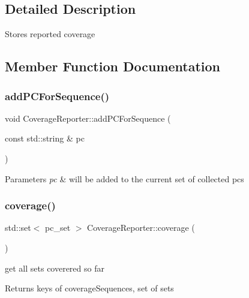 \subsection{Detailed Description}
Stores reported coverage 

\subsection{Member Function Documentation}
\mbox{\label{classCoverageReporter_a2ec8a765cc78851be632d08383e5dcac}} 
\subsubsection{\texorpdfstring{add\+P\+C\+For\+Sequence()}{addPCForSequence()}}
{\footnotesize\ttfamily void Coverage\+Reporter\+::add\+P\+C\+For\+Sequence (\begin{DoxyParamCaption}\item[{const std\+::string \&}]{pc }\end{DoxyParamCaption})}


\begin{DoxyParams}{Parameters}
{\em pc} & will be added to the current set of collected pcs \\
\hline
\end{DoxyParams}
\mbox{\label{classCoverageReporter_af515596c46758142ea7aa7dbbab47b7e}} 
\subsubsection{\texorpdfstring{coverage()}{coverage()}}
{\footnotesize\ttfamily std\+::set$<$ pc\+\_\+set $>$ Coverage\+Reporter\+::coverage (\begin{DoxyParamCaption}{ }\end{DoxyParamCaption})}

get all sets coverered so far \begin{DoxyReturn}{Returns}
keys of coverage\+Sequences, set of sets 
\end{DoxyReturn}
\mbox{\label{classCoverageReporter_a046428d09487a4a3d3420caf77f436df}} 
